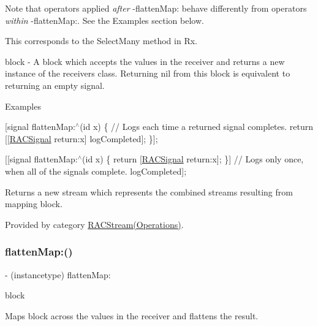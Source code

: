 Note that operators applied {\itshape after} -\/flatten\+Map\+: behave differently from operators {\itshape within} -\/flatten\+Map\+:. See the Examples section below.

This corresponds to the {\ttfamily Select\+Many} method in Rx.

block -\/ A block which accepts the values in the receiver and returns a new instance of the receiver\textquotesingle{}s class. Returning {\ttfamily nil} from this block is equivalent to returning an empty signal.

Examples

\mbox{[}signal flatten\+Map\+:$^\wedge$(id x) \{ // Logs each time a returned signal completes. return \mbox{[}\mbox{[}\mbox{\hyperlink{interface_r_a_c_signal}{R\+A\+C\+Signal}} return\+:x\mbox{]} log\+Completed\mbox{]}; \}\mbox{]};

\mbox{[}\mbox{[}signal flatten\+Map\+:$^\wedge$(id x) \{ return \mbox{[}\mbox{\hyperlink{interface_r_a_c_signal}{R\+A\+C\+Signal}} return\+:x\mbox{]}; \}\mbox{]} // Logs only once, when all of the signals complete. log\+Completed\mbox{]};

Returns a new stream which represents the combined streams resulting from mapping {\ttfamily block}. 

Provided by category \mbox{\hyperlink{category_r_a_c_stream_07_operations_08_a2441b0306adc6ae2845219f8b116119a}{R\+A\+C\+Stream(\+Operations)}}.

\mbox{\label{interface_r_a_c_stream_a2441b0306adc6ae2845219f8b116119a}} 
\subsubsection{\texorpdfstring{flatten\+Map\+:()}{flattenMap:()}\hspace{0.1cm}{\footnotesize\ttfamily [2/3]}}
{\footnotesize\ttfamily -\/ (instancetype) flatten\+Map\+: \begin{DoxyParamCaption}\item[{(\mbox{\hyperlink{interface_r_a_c_stream}{R\+A\+C\+Stream}} $\ast$($^\wedge$)(id value))}]{block }\end{DoxyParamCaption}}

Maps {\ttfamily block} across the values in the receiver and flattens the result.

